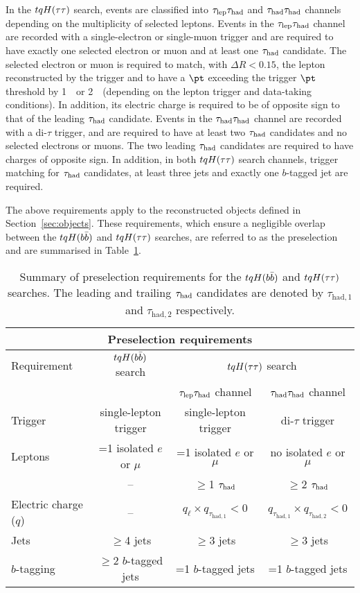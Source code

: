 In the $tqH(\tau\tau)$ search, events are classified into $\tau_{\mathrm{lep}} \tau_{\mathrm{had}}$ and $\tau_{\mathrm{had}} \tau_{\mathrm{had}}$ channels depending on the 
multiplicity of selected leptons. Events in the $\tau_{\mathrm{lep}} \tau_{\mathrm{had}}$ channel are recorded with a single-electron or single-muon trigger 
and are required to have exactly one selected electron or muon and at least one $\tau_{\mathrm{had}}$ candidate. 
The selected electron or muon is required to match, with $\Delta R < 0.15$, the lepton reconstructed by the trigger 
and to have a $\pt$ exceeding the trigger $\pt$ threshold by 1~\gev\ or 2~\gev\ (depending on the lepton trigger and 
data-taking conditions). In addition, its electric charge is required to be of opposite sign to that of the leading $\tau_{\mathrm{had}}$ candidate.
Events in the $\tau_{\mathrm{had}} \tau_{\mathrm{had}}$ channel are recorded with a di-$\tau$ trigger, and are required to have at least two $\tau_{\mathrm{had}}$ candidates and 
no selected electrons or muons. The two leading $\tau_{\mathrm{had}}$ candidates are required to have charges of opposite sign. 
In addition, in both $tqH(\tau\tau)$ search channels, trigger matching for $\tau_{\mathrm{had}}$ candidates, at least three jets and exactly one $b$-tagged jet are required.

The above requirements apply to the reconstructed objects defined in Section~\ref{sec:objects}.
These requirements, which ensure a negligible overlap between the $tqH(b\bar{b})$ and $tqH(\tau\tau)$ searches,
are referred to as the preselection and are summarised in Table~\ref{tab:preselection}. 

\begin{table*}[t!]
\caption{\small{Summary of preselection requirements for the $tqH(b\bar{b})$ and $tqH(\tau\tau)$ searches. 
The leading and trailing $\tau_{\mathrm{had}}$ candidates are denoted by $\tau_{\mathrm{had,1}}$ and $\tau_{\mathrm{had,2}}$ respectively.}}
\begin{center}
\begin{tabular}{l|c|cc}
\toprule\toprule
\multicolumn{4}{c}{Preselection requirements} \\      
\midrule
Requirement &  $tqH(b\bar{b})$ search & \multicolumn{2}{c}{$tqH(\tau\tau)$ search} \\      
& & $\tau_{\mathrm{lep}} \tau_{\mathrm{had}}$ channel & $\tau_{\mathrm{had}} \tau_{\mathrm{had}}$ channel \\
\midrule
Trigger & single-lepton trigger & single-lepton trigger & di-$\tau$ trigger  \\
Leptons  & =1 isolated $e$ or $\mu$ & =1 isolated $e$ or $\mu$ & no isolated $e$ or $\mu$ \\
               & -- & $\geq$1 $\tau_{\mathrm{had}}$ & $\geq$2 $\tau_{\mathrm{had}}$ \\
Electric charge ($q$) & -- & $q_\ell \times q_{\tau_{\mathrm{had,1}}} < 0$ & $q_{\tau_{\mathrm{had,1}}} \times q_{\tau_{\mathrm{had,2}}} < 0$ \\
Jets  &  $\geq$4 jets & $\geq$3 jets & $\geq$3 jets \\
$b$-tagging & $\geq$2 $b$-tagged jets & =1 $b$-tagged jets & =1 $b$-tagged jets  \\
\bottomrule\bottomrule
\end{tabular}
\label{tab:preselection}
\end{center}
\end{table*}
